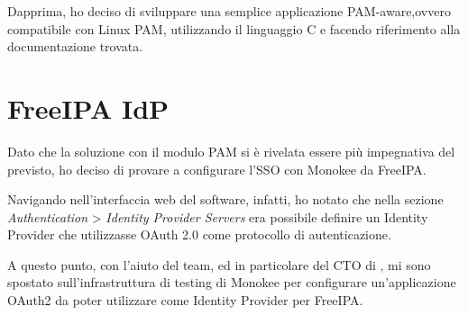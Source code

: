Dapprima, ho deciso di sviluppare una semplice applicazione PAM-aware,ovvero compatibile con Linux PAM, utilizzando il linguaggio C e facendo riferimento alla documentazione trovata.   


\section{FreeIPA IdP}

Dato che la soluzione con il modulo PAM si è rivelata essere più impegnativa del previsto, ho deciso di provare a configurare l'SSO con Monokee da FreeIPA. 

Navigando nell'interfaccia web del software, infatti, ho notato che nella sezione \textit{Authentication} > \textit{Identity Provider Servers} era possibile definire un Identity Provider che utilizzasse OAuth 2.0 come protocollo di autenticazione.

A questo punto, con l'aiuto del team, ed in particolare del CTO di \myAzienda, mi sono spostato sull'infrastruttura di testing di Monokee per configurare un'applicazione OAuth2 da poter utilizzare come Identity Provider per FreeIPA.

